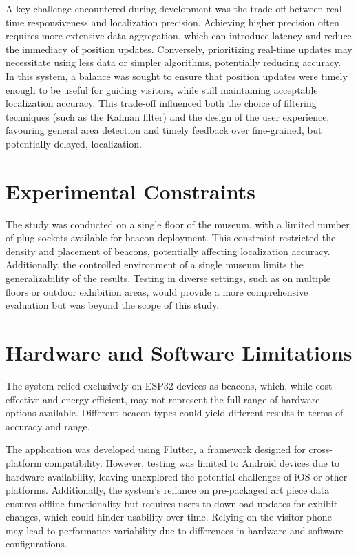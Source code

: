 A key challenge encountered during development was the trade-off between real-time responsiveness and localization precision. Achieving higher precision often requires more extensive data aggregation, which can introduce latency and reduce the immediacy of position updates. Conversely, prioritizing real-time updates may necessitate using less data or simpler algorithms, potentially reducing accuracy. In this system, a balance was sought to ensure that position updates were timely enough to be useful for guiding visitors, while still maintaining acceptable localization accuracy. This trade-off influenced both the choice of filtering techniques (such as the Kalman filter) and the design of the user experience, favouring general area detection and timely feedback over fine-grained, but potentially delayed, localization.

\section{Experimental Constraints}
The study was conducted on a single floor of the museum, with a limited number of plug sockets available for beacon deployment. This constraint restricted the density and placement of beacons, potentially affecting localization accuracy. Additionally, the controlled environment of a single museum limits the generalizability of the results. Testing in diverse settings, such as on multiple floors or outdoor exhibition areas, would provide a more comprehensive evaluation but was beyond the scope of this study.

\section{Hardware and Software Limitations}
The system relied exclusively on ESP32 devices as beacons, which, while cost-effective and energy-efficient, may not represent the full range of hardware options available. Different beacon types could yield different results in terms of accuracy and range.

The application was developed using Flutter, a framework designed for cross-platform compatibility. However, testing was limited to Android devices due to hardware availability, leaving unexplored the potential challenges of iOS or other platforms. Additionally, the system’s reliance on pre-packaged art piece data ensures offline functionality but requires users to download updates for exhibit changes, which could hinder usability over time. Relying on the visitor phone may lead to performance variability due to differences in hardware and software configurations. 


